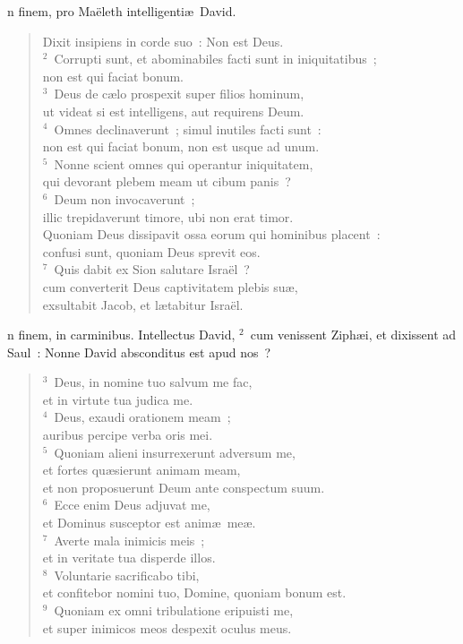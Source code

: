 \bchapter[Psalm]
n finem, pro Ma\"eleth intelligenti\ae\ David. \begin{verse}Dixit insipiens in corde suo~: Non est Deus.\\
${}^{2}$~Corrupti sunt, et abominabiles facti sunt in iniquitatibus~;\\ non est qui faciat bonum.\\
${}^{3}$~Deus de c\ae lo prospexit super filios hominum,\\ ut videat si est intelligens, aut requirens Deum.\\
${}^{4}$~Omnes declinaverunt~; simul inutiles facti sunt~:\\ non est qui faciat bonum, non est usque ad unum.\\
${}^{5}$~Nonne scient omnes qui operantur iniquitatem,\\ qui devorant plebem meam ut cibum panis~?\\
${}^{6}$~Deum non invocaverunt~;\\ illic trepidaverunt timore, ubi non erat timor.\\ Quoniam Deus dissipavit ossa eorum qui hominibus placent~:\\ confusi sunt, quoniam Deus sprevit eos.\\
${}^{7}$~Quis dabit ex Sion salutare Isra\"el~?\\ cum converterit Deus captivitatem plebis su\ae ,\\ exsultabit Jacob, et l\ae tabitur Isra\"el.\end{verse}



\bchapter[Psalm]
n finem, in carminibus. Intellectus David,
${}^{2}$~cum venissent Ziph\ae i, et dixissent ad Saul~: Nonne David absconditus est apud nos~?
\begin{verse}${}^{3}$~Deus, in nomine tuo salvum me fac,\\ et in virtute tua judica me.\\
${}^{4}$~Deus, exaudi orationem meam~;\\ auribus percipe verba oris mei.\\
${}^{5}$~Quoniam alieni insurrexerunt adversum me,\\ et fortes qu\ae sierunt animam meam,\\ et non proposuerunt Deum ante conspectum suum.\\
${}^{6}$~Ecce enim Deus adjuvat me,\\ et Dominus susceptor est anim\ae\ me\ae .\\
${}^{7}$~Averte mala inimicis meis~;\\ et in veritate tua disperde illos.\\
${}^{8}$~Voluntarie sacrificabo tibi,\\ et confitebor nomini tuo, Domine, quoniam bonum est.\\
${}^{9}$~Quoniam ex omni tribulatione eripuisti me,\\ et super inimicos meos despexit oculus meus.\end{verse}



